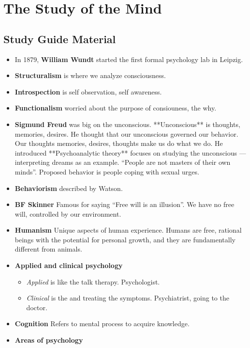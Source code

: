 \documentclass{article}
\begin{document}
\section{The Study of the Mind}
\subsection{Study Guide Material}
\begin{itemize}
    \item In 1879, \textbf{William Wundt} started the first formal psychology lab in Leipzig.
    \item \textbf{Structuralism} is where we analyze consciousness.
    \item \textbf{Introspection} is self observation, self awareness.
    \item \textbf{Functionalism} worried about the purpose of consiouness, the why.
    \item \textbf{Sigmund Freud} was big on the unconscious. **Unconscious** is thoughts, memories, desires. He thought that our unconscious governed our behavior. Our thoughts memories, desires, thoughts make us do what we do. He introduced **Psychoanalytic theory** focuses on studying the unconscious --- interpreting dreams as an example. ``People are not masters of their own minds''. Proposed behavior is people coping with sexual urges.
    \item \textbf{Behaviorism} described by Watson.
    \item \textbf{BF Skinner} Famous for saying ``Free will is an illusion''. We have no free will, controlled by our environment.
    \item \textbf{Humanism} Unique aspects of human experience. Humans are free, rational beings with the potential for personal growth, and they are fundamentally different from animals.
    \item \textbf{Applied and clinical psychology}
    \begin{itemize}
        \item \textit{Applied} is like the talk therapy. Psychologist.
        \item \textit{Clinical} is the   and treating the symptoms. Psychiatrist, going to the doctor.
    \end{itemize}
    \item \textbf{Cognition} Refers to mental process to acquire knowledge.
    \item \textbf{Areas of psychology}
\end{itemize}
\end{document}
